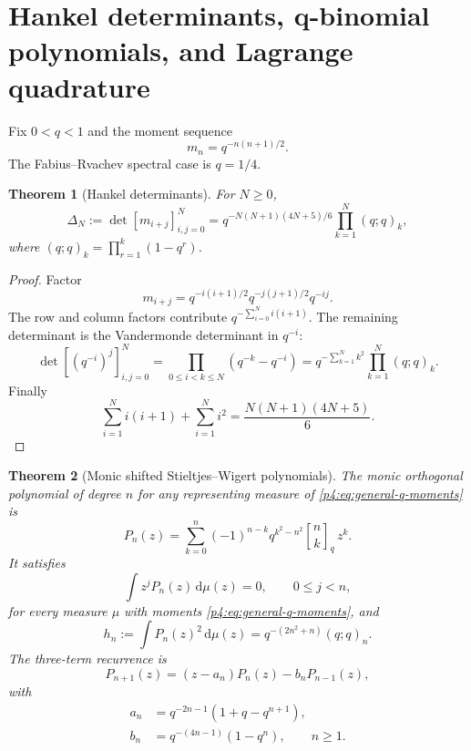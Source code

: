 \documentclass[11pt,oneside]{article}
\newtheorem{theorem}{Theorem}[section]
\theoremstyle{definition}
\theoremstyle{remark}
\newcommand{\dd}{\,\mathrm d}
\newcommand{\qbinom}[3]{\genfrac{[}{]}{0pt}{}{#1}{#2}_{#3}}
\begin{document}
\section{Hankel determinants, q-binomial polynomials, and Lagrange quadrature}
\label{p4:sec:q-orthogonal}

Fix $0<q<1$ and the moment sequence
\begin{equation}
 m_n=q^{-n(n+1)/2}.
 \label{p4:eq:general-q-moments}
\end{equation}
The Fabius--Rvachev spectral case is $q=1/4$.

\begin{theorem}[Hankel determinants]
\label{p4:thm:Hankel-determinants}
For $N\geq0$,
\begin{equation}
 \boxed{
 \Delta_N:=\det[m_{i+j}]_{i,j=0}^{N}
 =q^{-N(N+1)(4N+5)/6}
 \prod_{k=1}^{N}(q;q)_k,}
 \label{p4:eq:Hankel-determinant}
\end{equation}
where $(q;q)_k=\prod_{r=1}^k(1-q^r)$.
\end{theorem}

\begin{proof}
Factor
\[
 m_{i+j}=q^{-i(i+1)/2}q^{-j(j+1)/2}q^{-ij}.
\]
The row and column factors contribute
$q^{-\sum_{i=0}^N i(i+1)}$.  The remaining determinant is the Vandermonde determinant in
$q^{-i}$:
\[
 \det[(q^{-i})^j]_{i,j=0}^N
 =\prod_{0\leq i<k\leq N}(q^{-k}-q^{-i})
 =q^{-\sum_{k=1}^Nk^2}\prod_{k=1}^{N}(q;q)_k.
\]
Finally
\[
 \sum_{i=1}^{N}i(i+1)+\sum_{i=1}^{N}i^2
 =\frac{N(N+1)(4N+5)}6.
\]
\end{proof}

\begin{theorem}[Monic shifted Stieltjes--Wigert polynomials]
\label{p4:thm:SW-polynomials}
The monic orthogonal polynomial of degree $n$ for any representing measure of
\eqref{p4:eq:general-q-moments} is
\begin{equation}
 \boxed{
 P_n(z)=\sum_{k=0}^{n}
 (-1)^{n-k}q^{k^2-n^2}\qbinom{n}{k}{q}\,z^k.}
 \label{p4:eq:SW-polynomial}
\end{equation}
It satisfies
\begin{equation}
 \int z^jP_n(z)\dd\mu(z)=0,
 \qquad0\leq j<n,
 \label{p4:eq:SW-orthogonality}
\end{equation}
for every measure $\mu$ with moments \eqref{p4:eq:general-q-moments}, and
\begin{equation}
 h_n:=\int P_n(z)^2\dd\mu(z)
 =q^{-(2n^2+n)}(q;q)_n.
 \label{p4:eq:SW-norm}
\end{equation}
The three-term recurrence is
\begin{equation}
 P_{n+1}(z)=(z-a_n)P_n(z)-b_nP_{n-1}(z),
 \label{p4:eq:SW-recurrence}
\end{equation}
with
\begin{align}
 a_n&=q^{-2n-1}(1+q-q^{n+1}),\label{p4:eq:an}\\
 b_n&=q^{-(4n-1)}(1-q^n),\qquad n\geq1.
 \label{p4:eq:bn}
\end{align}
\end{theorem}
\end{document}
